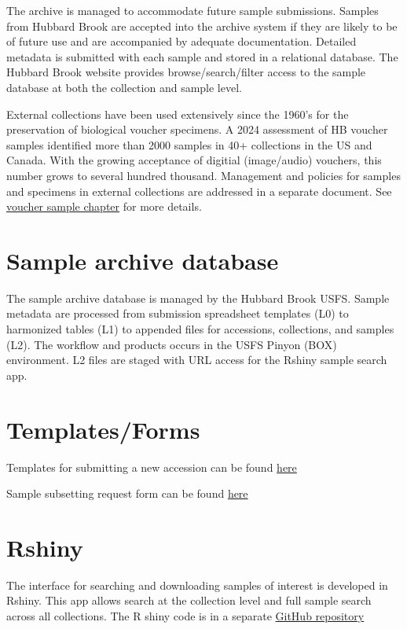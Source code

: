 \documentclass[
  letterpaper,
  DIV=11,
  numbers=noendperiod]{scrreprt}
\begin{document}
The archive is managed to accommodate future sample submissions. Samples
from Hubbard Brook are accepted into the archive system if they are
likely to be of future use and are accompanied by adequate
documentation. Detailed metadata is submitted with each sample and
stored in a relational database. The Hubbard Brook website provides
browse/search/filter access to the sample database at both the
collection and sample level.

External collections have been used extensively since the 1960's for the
preservation of biological voucher specimens. A 2024 assessment of HB
voucher samples identified more than 2000 samples in 40+ collections in
the US and Canada. With the growing acceptance of digitial (image/audio)
vouchers, this number grows to several hundred thousand. Management and
policies for samples and specimens in external collections are addressed
in a separate document. See \href{VoucherSamples.qmd}{voucher sample
chapter} for more details.

\section{Sample archive database}\label{sample-archive-database}

The sample archive database is managed by the Hubbard Brook USFS. Sample
metadata are processed from submission spreadsheet templates (L0) to
harmonized tables (L1) to appended files for accessions, collections,
and samples (L2). The workflow and products occurs in the USFS Pinyon
(BOX) environment. L2 files are staged with URL access for the Rshiny
sample search app.

\section{Templates/Forms}\label{templatesforms}

Templates for submitting a new accession can be found \href{link}{here}

Sample subsetting request form can be found
\href{subsampling_request.pdf}{here}

\section{Rshiny}\label{rshiny}

The interface for searching and downloading samples of interest is
developed in Rshiny. This app allows search at the collection level and
full sample search across all collections. The R shiny code is in a
separate \href{link}{GitHub repository}
\end{document}
